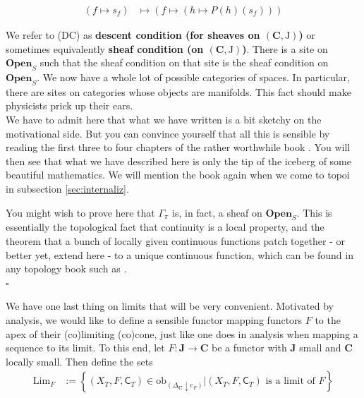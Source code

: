 \begin{exa}
\begin{enumerate}
\begin{align*}
  \left(
    f
    \mapsto
    s_{f}
  \right)
  &\mapsto
  \left(
    f
    \mapsto
    \left(
      h
      \mapsto
      P(h)(s_{f})
    \right)
  \right)
\end{align*}
\end{enumerate}
We refer to (DC) as \textbf{descent condition (for sheaves on $(\mathbf{C},\mathrm{J})$)} or sometimes equivalently \textbf{sheaf condition (on $(\mathbf{C},\mathrm{J})$)}.
There is a site on $\mathbf{Open}_{S}$ such that the sheaf condition on that site is the sheaf condition on $\mathbf{Open}_{S}$.
We now have a whole lot of possible categories of spaces.
In particular, there are sites on categories whose objects are manifolds.
This fact should make physicists prick up their ears.
\\
We have to admit here that what we have written is a bit sketchy on the motivational side.
But you can convince yourself that all this is sensible by reading the first three to four chapters of the rather worthwhile book \cite{c55c71e8}.
You will then see that what we have described here is only the tip of the iceberg of some beautiful mathematics.
We will mention the book again when we come to topoi in subsection \ref{sec:internaliz}.
\end{exa}
\begin{prf}
You might wish to prove here that $\Gamma_{\pi}$ is, in fact, a sheaf on $\mathbf{Open}_{S}$.
This is essentially the topological fact that continuity is a local property, and the theorem that a bunch of locally given continuous functions patch together - or better yet, extend here - to a unique continuous function, which can be found in any topology book such as \cite{273ba834}.
\\
\phantom{proven}
\hfill
$\square$
\end{prf}
We have one last thing on limits that will be very convenient.
Motivated by analysis, we would like to define a sensible functor mapping functors $F$ to the apex of their (co)limiting (co)cone, just like one does in analysis when mapping a sequence to its limit.
To this end, let $F \colon \mathbf{J} \rightarrow \mathbf{C}$ be a functor with $\mathbf{J}$ small and $\mathbf{C}$ locally small.
Then define the sets
\begin{align*}
  \mathrm{Lim}_{F}
  &:=
  \left\lbrace
      (X_{T},F,\mathsf{C}_{T})
      \in
      \mathrm{ob}_{(\Delta_{\mathbf{C}} \downarrow \mathrm{c}_{F})}
    \vert
      (X_{T},F,\mathsf{C}_{T})
      \text{ is a limit of }
      F
  \right\rbrace
\end{align*}
